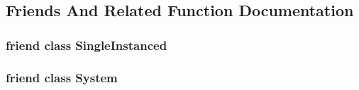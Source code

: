 \subsection{Friends And Related Function Documentation}
\hypertarget{classZeta_1_1LuaEngine_a2fa95d69b32a77fffa4b730679a8b08c}{
\subsubsection[{Single\+Instanced}]{\setlength{\rightskip}{0pt plus 5cm}friend class {\bf Single\+Instanced}\hspace{0.3cm}{\ttfamily [friend]}}}\label{classZeta_1_1LuaEngine_a2fa95d69b32a77fffa4b730679a8b08c}
\hypertarget{classZeta_1_1LuaEngine_af18a9ee98e70982bfe2975391d7221a5}{
\subsubsection[{System}]{\setlength{\rightskip}{0pt plus 5cm}friend class {\bf System}\hspace{0.3cm}{\ttfamily [friend]}}}\label{classZeta_1_1LuaEngine_af18a9ee98e70982bfe2975391d7221a5}


